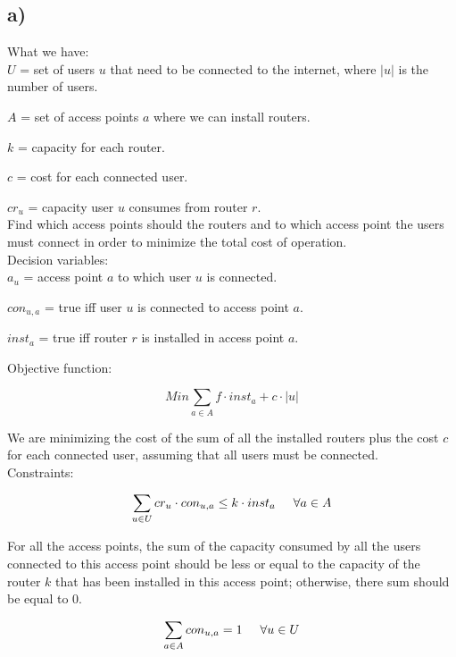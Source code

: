 \documentclass[11pt, oneside]{article}   	%
\begin{document}
\subsection{a)}

\hspace{\parindent}What we have:\\
 
$U$ = set of users $u$ that need to be connected to the internet, where $|u|$ is the number of users.

$A$ = set of access points $a$ where we can install routers.

$k$ = capacity for each router.

$c$ = cost for each connected user.

$cr_u$ = capacity user $u$ consumes from router $r$.\\

Find which access points should the routers and to which access point the users must connect in order to minimize the total cost of operation.\\

Decision variables:\\

$a_u$ = access point $a$ to which user $u$ is connected.

$con_{u,a}$ = true iff user $u$ is connected to access point $a$.

$inst_a$ = true iff router $r$ is installed in access point $a$.

Objective function:

$$Min \sum_{a \in A} f \cdot inst_a + c \cdot |u|$$

We are minimizing the cost of the sum of all the installed routers plus the cost $c$ for each connected user, assuming that all users must be connected.\\

Constraints:

$$\sum_{u \in U} cr_u \cdot con_{u,a} \leq k \cdot inst_a \hspace{5 mm} \forall a \in A$$

For all the access points, the sum of the capacity consumed by all the users connected to this access point should be less or equal to the capacity of the router $k$ that has been installed in this access point; otherwise, there sum should be equal to $0$.

$$\sum_{a \in A} con_{u,a} = 1 \hspace{5 mm} \forall u \in U$$
\end{document}
